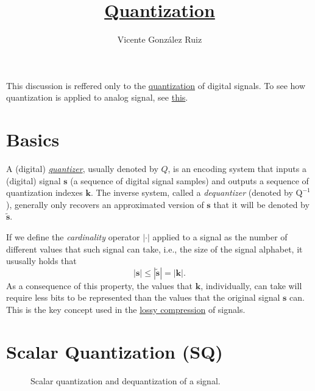 
\title{\href{https://github.com/vicente-gonzalez-ruiz/quantization}{Quantization}}

\author{Vicente González Ruiz}

\maketitle

This discussion is reffered only to the
\href{https://en.wikipedia.org/wiki/Quantization_(signal_processing)}{quantization}
of digital signals. To see how quantization is applied to analog
signal, see
\href{https://vicente-gonzalez-ruiz.github.io/analog_quantization/}{this}.

\section{Basics}

A (digital)
\href{https://en.wikipedia.org/wiki/Quantization_(signal_processing)}{\emph{quantizer}},
usually denoted by $Q$, is an encoding system that inputs a (digital)
signal $\mathbf{s}$ (a sequence of digital signal samples) and outputs
a sequence of quantization indexes ${\mathbf k}$. The inverse system,
called a \emph{dequantizer} (denoted by $\text{Q}^{-1}$), generally
only recovers an approximated version of ${\mathbf s}$ that it will be
denoted by $\tilde{{\mathbf s}}$.

If we define the \emph{cardinality} operator $|\cdot|$ applied to a
signal as the number of different values that such signal can take,
i.e., the size of the signal alphabet, it ususally holds that
\begin{equation}
  |{\mathbf s}|\leq|\tilde{\mathbf s}| = |{\mathbf k}|.
\end{equation}
As a consequence of this property, the values that ${\mathbf k}$, individually,
can take will require less bits to be represented than the values that
the original signal ${\mathbf s}$ can. This is the key concept used in
the \href{https://en.wikipedia.org/wiki/Lossy_compression}{lossy
  compression} of signals.


\section{Scalar Quantization (SQ)}

\begin{figure}
  \centering {}
  \caption{Scalar quantization and dequantization of a signal.}
  \label{fig:Q}
\end{figure}

